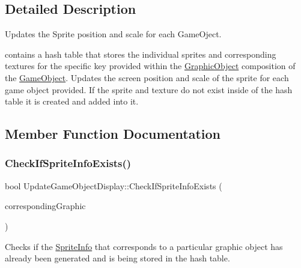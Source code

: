 \subsection{Detailed Description}
Updates the Sprite position and scale for each Game\+Oject. 

contains a hash table that stores the individual sprites and corresponding textures for the specific key provided within the \hyperlink{class_graphic_object}{Graphic\+Object} composition of the \hyperlink{class_game_object}{Game\+Object}. Updates the screen position and scale of the sprite for each game object provided. If the sprite and texture do not exist inside of the hash table it is created and added into it. 

\subsection{Member Function Documentation}
\mbox{\label{class_update_game_object_display_a10502ed4d422e5bab6b5f3591d392c55}} 
\subsubsection{\texorpdfstring{Check\+If\+Sprite\+Info\+Exists()}{CheckIfSpriteInfoExists()}}
{\footnotesize\ttfamily bool Update\+Game\+Object\+Display\+::\+Check\+If\+Sprite\+Info\+Exists (\begin{DoxyParamCaption}\item[{const \hyperlink{class_graphic_object}{Graphic\+Object} \&}]{corresponding\+Graphic }\end{DoxyParamCaption})\hspace{0.3cm}{\ttfamily [private]}}



Checks if the \hyperlink{struct_sprite_info}{Sprite\+Info} that corresponds to a particular graphic object has already been generated and is being stored in the hash table. 


